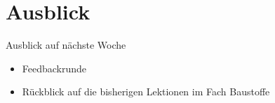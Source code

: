 \section{Ausblick}
\BlueSectionSlide
{}

\begin{frame}{Ausblick auf nächste Woche}
	\begin{itemize}
		\item[\textbullet] Feedbackrunde
		\item[\textbullet] Rückblick auf die bisherigen Lektionen im Fach Baustoffe
	\end{itemize}
\end{frame}




